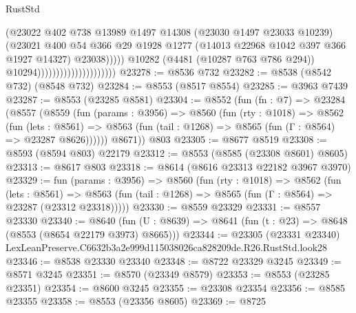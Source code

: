 \begin{lexlean}{RustStd}
\begin{coremodule}
                                                    (@23022
                                                      @402
                                                      @738
                                                      @13989
                                                      @1497
                                                      @14308
                                                      (@23030 @1497 @23033 @10239)
                                                      (@23021
                                                        @400
                                                        @54
                                                        @366
                                                        @29
                                                        @1928
                                                        @1277
                                                        (@14013 @22968 @1042 @397 @366 @1927 @14327)
                                                        @23038)))))
                                              @10282
                                              (@4481 (@10287 @763 @786 @294))
                                              @10294)))))))))))))))))))))
@23278 := @8536 @732
@23282 := @8538 (@8542 @732) (@8548 @732)
@23284 := @8553 (@8517 @8554)
@23285 := @3963 @7439
@23287 := @8553 (@23285 @8581)
@23304 := @8552
    (fun (fn : @7) =>
    @23284
      (@8557
        (@8559
          (fun (params : @3956) =>
          @8560
            (fun (rty : @1018) =>
            @8562
              (fun (lets : @8561) =>
              @8563 (fun (tail : @1268) => @8565 (fun (Γ : @8564) => @23287 @8626))))))
        @8671))
    @803
@23305 := @8677 @8519
@23308 := @8593 (@8594 @803) @22179
@23312 := @8553 (@8585 (@23308 @8601) @8605)
@23313 := @8617 @803
@23318 := @8614 (@8616 @23313 @22182 @3967 @3970)
@23329 := fun (params : @3956) =>
  @8560
    (fun (rty : @1018) =>
    @8562
      (fun (lets : @8561) =>
      @8563 (fun (tail : @1268) => @8565 (fun (Γ : @8564) => @23287 (@23312 @23318)))))
@23330 := @8559 @23329
@23331 := @8557 @23330
@23340 := @8640
    (fun (U : @8639) => @8641 (fun (t : @23) => @8648 (@8553 (@8654 @22179 @3973) @8665)))
@23344 := @23305
    (@23331 @23340)
    LexLeanPreserve.C6632b3a2e999d115038026ca828209de.R26.RustStd.look28
@23346 := @8538 @23330 @23340
@23348 := @8722 @23329 @3245
@23349 := @8571 @3245
@23351 := @8570 (@23349 @8579)
@23353 := @8553 (@23285 @23351)
@23354 := @8600 @3245
@23355 := @23308 @23354
@23356 := @8585 @23355
@23358 := @8553 (@23356 @8605)
@23369 := @8725

\end{coremodule}
\end{lexlean}
